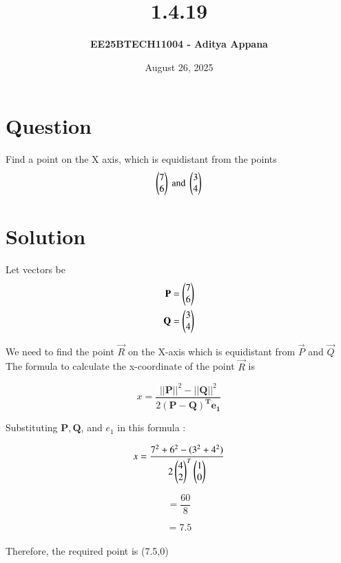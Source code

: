 \documentclass[12pt]{article}
\title{\textbf{1.4.19}}
\author{\textbf{EE25BTECH11004 - Aditya Appana}}
\date{August 26, 2025}
\begin{document}
\maketitle

\section*{Question}
Find a point on the X axis, which is equidistant from the points 
\begin{align*}
\myvec{ 7 \\ 6 }\text{ and }\myvec{3 \\ 4}
\end{align*}

\section*{Solution}
Let vectors be 
\begin{align} 
\vec{P}=\myvec{7 \\ 6} \\
\vec{Q}=\myvec{3 \\ 4}
\end{align}

\vspace{1cm}

We need to find the point $\vec{R}$ on the X-axis which is equidistant from $\vec{P}$ and $\vec{Q}$ \\
The formula to calculate the x-coordinate of the point $\vec{R}$ is

\vspace{1cm}


$$x= \frac{ ||\mathbf{P}||^2 - ||\mathbf{Q}||^2 }{2\mathbf{(P-Q)^T e_1}}$$


\vspace{1cm}

\newpage
Substituting $\mathbf{P, Q}$, and $e_1$ in this formula :


$$x = \frac{7^2+6^2-(3^2+4^2)}{2 \myvec{4 \\ 2}^T \myvec{1\\0}}$$


$$=\frac{60}{8}$$



$$= 7.5$$ \\





Therefore, the required point is (7.5,0)
\end{document}
